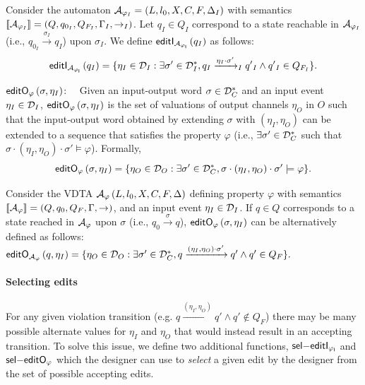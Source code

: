 Consider the automaton
 ${\mathcal A}_{\varphi_I}=\left(L, {l_0}, X,  C, F,  \Delta_I \right)$ with semantics $[\!\left[{\mathcal A}_{\varphi_I}\right]\!]=\left( Q, q_{0_I}, Q_{F_I}, \Gamma_I, \to_I \right)$.
 Let $q_I\in Q_I$ correspond to a state reachable in ${\mathcal A}_{\varphi_I}$ (i.e., $q_{0_I} \xrightarrow{\sigma_I} q_I$) upon $\sigma_I$.
 	We define $\mathsf{editI_{{\mathcal A}_{\varphi_I}}}\left(q_I\right)$ as follows:
\[\mathsf{editI_{{\mathcal A}_{\varphi_I}}}\left( q_I \right) = \{ \eta_I \in {\mathcal D}_I: \exists \sigma'\in {\mathcal D}_I^*, q_I \xrightarrow{\eta_I \cdot \sigma'}_I q{'{_I}} \wedge q{'{_I}} \in Q_{F_I} \}.\]

\item {\boldmath$\mathsf{editO_{\varphi}}\left(\sigma, \eta_I\right)$}:
~~Given an input-output word $\sigma\in {\mathcal D}_C^*$ and an input event $\eta_I\in {\mathcal D}_I$, $\mathsf{editO_{\varphi}}\left(\sigma, \eta_I\right)$ is the set of valuations of output channels $\eta_O$ in $O$ such that the input-output word obtained by extending $\sigma$ with $(\eta_I,\eta_O)$ can be extended to a sequence that satisfies the property $\varphi$ (i.e., $\exists \sigma' \in {\mathcal D}_{C}^*$ such that $\sigma\cdot(\eta_I,\eta_O)\cdot\sigma'\models\varphi$).
Formally,
\[\mathsf{editO_{\varphi}}\left(\sigma,\eta_I\right) = \{\eta_O \in {\mathcal D}_O: \exists \sigma'\in {\mathcal D}_{C}^*, \sigma \cdot \left(\eta_I,\eta_O\right) \cdot \sigma' \models \varphi \}.
\]

%
Consider the \ac{VDTA} ${\mathcal A}_{\varphi}\left(L, {l_0}, X, C, F,  \Delta \right)$ defining property $\varphi$ with semantics $[\!\left[{\mathcal A}_\varphi\right]\!]=\left( Q, q_{0}, Q_{F}, \Gamma, \to \right)$, and an input event $\eta_I\in {\mathcal D}_I$.
If $q\in Q$ corresponds to a state reached in ${\mathcal A}_{\varphi}$ upon $\sigma$ (i.e., $q_{0} \xrightarrow{\sigma} q$), $\mathsf{editO_{\varphi}}\left(\sigma, \eta_I\right)$ can be alternatively defined as follows:
%
%
\\
$\mathsf{editO_{{\mathcal A}_\varphi}}\left(q,\eta_I\right) = \{\eta_O \in {\mathcal D}_O: \exists \sigma'\in {\mathcal D}_C^*, q \xrightarrow{\left(\eta_I,\eta_O\right) \cdot \sigma'} q' \wedge q' \in Q_F \}.$

\paragraph{Selecting edits}
For any given violation transition (e.g. $q \xrightarrow{\left(\eta_I,\eta_O\right)} q' \wedge q' \notin Q_F$)
there may be many possible alternate values for $\eta_I$ and $\eta_O$ that would instead result in an accepting transition.
To solve this issue, we define two additional functions, $\mathsf{{sel}\relax{-} editI_{\varphi_{I}}}$ and $\mathsf{{sel}\relax{-} editO_{\varphi}}$ which the designer can use to \emph{select} a given edit by the designer from the set of possible accepting edits.

